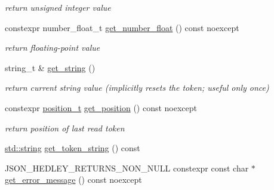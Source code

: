 \begin{DoxyCompactItemize}
\begin{DoxyCompactList}\small\item\em return unsigned integer value \end{DoxyCompactList}\item 
\mbox{\label{classnlohmann_1_1detail_1_1lexer_ac013af35a21e9387993b19da5b3e0ae2}} 
constexpr number\+\_\+float\+\_\+t \mbox{\hyperlink{classnlohmann_1_1detail_1_1lexer_ac013af35a21e9387993b19da5b3e0ae2}{get\+\_\+number\+\_\+float}} () const noexcept
\begin{DoxyCompactList}\small\item\em return floating-\/point value \end{DoxyCompactList}\item 
\mbox{\label{classnlohmann_1_1detail_1_1lexer_a54aa290ff2f60218a8f35f1ebf81666d}} 
string\+\_\+t \& \mbox{\hyperlink{classnlohmann_1_1detail_1_1lexer_a54aa290ff2f60218a8f35f1ebf81666d}{get\+\_\+string}} ()
\begin{DoxyCompactList}\small\item\em return current string value (implicitly resets the token; useful only once) \end{DoxyCompactList}\item 
\mbox{\label{classnlohmann_1_1detail_1_1lexer_abf5143501435f9f79898c1ff238c2622}} 
constexpr \mbox{\hyperlink{structnlohmann_1_1detail_1_1position__t}{position\+\_\+t}} \mbox{\hyperlink{classnlohmann_1_1detail_1_1lexer_abf5143501435f9f79898c1ff238c2622}{get\+\_\+position}} () const noexcept
\begin{DoxyCompactList}\small\item\em return position of last read token \end{DoxyCompactList}\item 
\mbox{\hyperlink{namespacenlohmann_1_1detail_a1ed8fc6239da25abcaf681d30ace4985ab45cffe084dd3d20d928bee85e7b0f21}{std\+::string}} \mbox{\hyperlink{classnlohmann_1_1detail_1_1lexer_a4aef7e72e539be04e139c34872421f2a}{get\+\_\+token\+\_\+string}} () const
\item 
\mbox{\label{classnlohmann_1_1detail_1_1lexer_a3cead908f797ffa091bb67e90985739d}} 
J\+S\+O\+N\+\_\+\+H\+E\+D\+L\+E\+Y\+\_\+\+R\+E\+T\+U\+R\+N\+S\+\_\+\+N\+O\+N\+\_\+\+N\+U\+LL constexpr const char $\ast$ \mbox{\hyperlink{classnlohmann_1_1detail_1_1lexer_a3cead908f797ffa091bb67e90985739d}{get\+\_\+error\+\_\+message}} () const noexcept

\end{DoxyCompactItemize}
